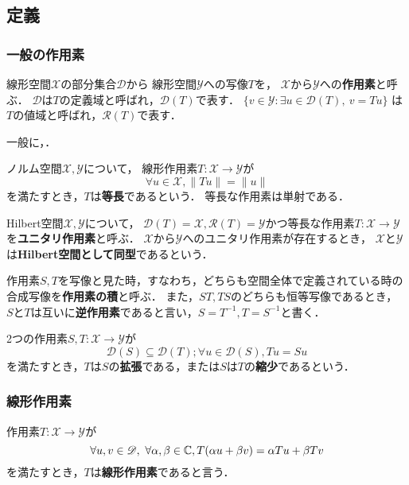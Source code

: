 \documentclass[a4j]{jarticle}
\newcommand{\dom}{\mathscr{D}}
\newcommand{\range}{\mathscr{R}}
\newcommand{\spX}{\mathscr{X}}
\newcommand{\spY}{\mathscr{Y}}
\begin{document}
    \subsection{定義}
    \subsubsection{一般の作用素}
    \begin{Def}
        線形空間$\spX$の部分集合$\dom$から
        線形空間$\spY$への写像$T$を，
        $\spX$から$\spY$への\textbf{作用素}と呼ぶ．
        $\dom$は$T$の定義域と呼ばれ，$\dom(T)$で表す．
        $\{v \in \spY : \exists u \in \dom(T),~ v=Tu\}$
        は$T$の値域と呼ばれ，$\range(T)$で表す．
    \end{Def}
    一般に，．

    \begin{Def}
        ノルム空間$\spX, \spY$について，
        線形作用素$T:\spX \to \spY$が
        \[ \forall u \in \spX, \| Tu \|=\|u\| \]
        を満たすとき，$T$は\textbf{等長}であるという．
        等長な作用素は単射である．
    \end{Def}

    \begin{Def}
        Hilbert空間$\spX, \spY$について，
        $\dom(T)=\spX, \range(T)=\spY$かつ等長な作用素$T:\spX \to \spY$を\textbf{ユニタリ作用素}と呼ぶ．
        $\spX$から$\spY$へのユニタリ作用素が存在するとき，
        $\spX$と$\spY$は\textbf{Hilbert空間として同型}であるという．
    \end{Def}

    \begin{Def}
        作用素$S,T$を写像と見た時，すなわち，どちらも空間全体で定義されている時の合成写像を\textbf{作用素の積}と呼ぶ．
        また，$ST, TS$のどちらも恒等写像であるとき，
        $S$と$T$は互いに\textbf{逆作用素}であると言い，$S=T^{-1}, T=S^{-1}$と書く．
    \end{Def}

    \begin{Def}
        2つの作用素$S,T:\spX \to \spY$が
        \[ \dom(S) \subseteq \dom(T); \forall u \in \dom(S), Tu=Su \]
        を満たすとき，$T$は$S$の\textbf{拡張}である，または$S$は$T$の\textbf{縮少}であるという．
    \end{Def}

    \subsubsection{線形作用素}
    \begin{Def}
        作用素$T:\spX \to \spY$が
        \[ \forall u,v \in \dom,~ \forall \alpha, \beta \in \C, T(\alpha u+\beta v)=\alpha Tu+\beta Tv \]
        を満たすとき，$T$は\textbf{線形作用素}であると言う．
    \end{Def}
\end{document}
